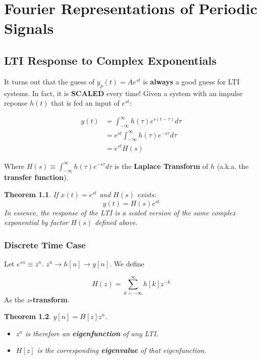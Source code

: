\documentclass[a4paper,12pt]{report}
\newtheorem{theorem}{Theorem}
\begin{document}
\chapter{Fourier Representations of Periodic Signals}

\section{LTI Response to Complex Exponentials}

It turns out that the guess of $y_p(t) = Ae^{st}$ is \textbf{always} a good guess for LTI systems. In fact, it is \textbf{SCALED} every time! Given a system with an impulse reponse $h(t)$ that is fed an input of $e^{st}$: 

\begin{equation}
\begin{split}
y(t) &= \int_{-\infty}^{\infty} h(\tau) e^{s(t-\tau)} d\tau \\
&= e^{st} \int_{-\infty}^\infty h(\tau) e^{-s\tau} d\tau \\
&= e^{st} H(s)
\end{split}
\end{equation}

Where $H(s) \equiv \int_{-\infty}^\infty h(\tau) e^{-s\tau} d\tau$ is the \textbf{Laplace Transform} of $h$ (a.k.a. the \textbf{transfer function}).

\begin{theorem}
If $x(t) = e^{st}$ and $H(s)$ exists: 
\begin{equation}
y(t) = H(s)e^{st}
\end{equation}
In essence, the response of the LTI is a scaled version of the same complex exponential by factor $H(s)$ defined above.
\end{theorem}

\subsection{Discrete Time Case}

Let $e^{sn} \equiv z^n$. $z^n \to h[n] \to y[n]$. We define

\begin{equation}
H(z) = \sum_{k=-\infty}^{\infty} h[k] z^{-k}
\end{equation}
As the \textbf{$z$-transform}. 

\begin{theorem}
$y[n] = H[z]z^n$. 
\begin{itemize}
\item $z^n$ is therefore an \textbf{eigenfunction} of any LTI.
\item $H[z]$ is the corresponding \textbf{eigenvalue} of that eigenfunction.
\end{itemize}
\end{theorem}
\end{document}
